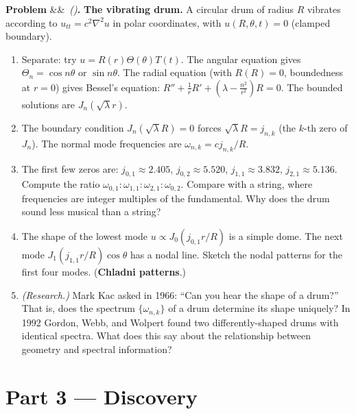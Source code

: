 \documentclass[12pt,a4paper]{article}
\newcounter{problem}
\newenvironment{problem}[1][]{\refstepcounter{problem}\par\vspace{6pt}\noindent\textbf{\color{MidBlue}Problem \theproblem}\ifx&#1&\else\ \textit{(#1)}\fi\textbf{.}\enskip}{\par\vspace{4pt}}
\begin{document}
\begin{problem}
\label{prob:drumhead}
\textbf{The vibrating drum.} A circular drum of radius $R$ vibrates according to $u_{tt}=c^2\nabla^2 u$ in polar coordinates, with $u(R,\theta,t)=0$ (clamped boundary).
\begin{enumerate}[label=(\alph*),topsep=2pt]
  \item Separate: try $u = R(r)\Theta(\theta)T(t)$. The angular equation gives $\Theta_n = \cos n\theta$ or $\sin n\theta$. The radial equation (with $R(R)=0$, boundedness at $r=0$) gives Bessel's equation: $R'' + \frac{1}{r}R' + \left(\lambda - \frac{n^2}{r^2}\right)R = 0$. The bounded solutions are $J_n(\sqrt{\lambda}r)$.
  \item The boundary condition $J_n(\sqrt{\lambda}R)=0$ forces $\sqrt{\lambda}R = j_{n,k}$ (the $k$-th zero of $J_n$). The normal mode frequencies are $\omega_{n,k} = cj_{n,k}/R$.
  \item The first few zeros are: $j_{0,1}\approx 2.405$, $j_{0,2}\approx 5.520$, $j_{1,1}\approx 3.832$, $j_{2,1}\approx 5.136$. Compute the ratio $\omega_{0,1}:\omega_{1,1}:\omega_{2,1}:\omega_{0,2}$. Compare with a string, where frequencies are integer multiples of the fundamental. Why does the drum sound less musical than a string?
  \item The shape of the lowest mode $u\propto J_0(j_{0,1}r/R)$ is a simple dome. The next mode $J_1(j_{1,1}r/R)\cos\theta$ has a nodal line. Sketch the nodal patterns for the first four modes. (\textbf{Chladni patterns}.)
  \item \textit{(Research.)} Mark Kac asked in 1966: ``Can you hear the shape of a drum?'' That is, does the spectrum $\{\omega_{n,k}\}$ of a drum determine its shape uniquely? In 1992 Gordon, Webb, and Wolpert found two differently-shaped drums with identical spectra. What does this say about the relationship between geometry and spectral information?
\end{enumerate}
\end{problem}

\section{Part 3 \texorpdfstring{---}{--} Discovery}
\end{document}
